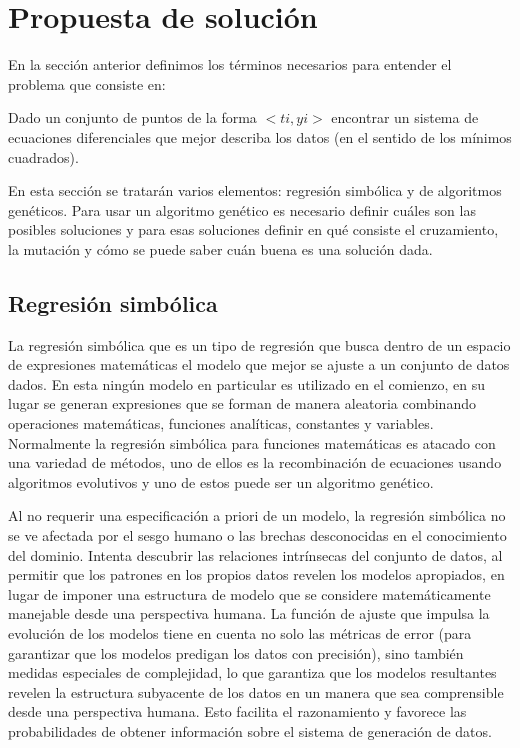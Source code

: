 \chapter{Propuesta de solución}\label{chapter:SolutionProposal}

En la sección anterior definimos los términos necesarios para entender el problema que consiste en:

Dado un conjunto de puntos de la forma $<ti,yi>$ encontrar un sistema de ecuaciones diferenciales que mejor describa los datos (en el sentido de los mínimos cuadrados).

En esta sección se tratarán varios elementos: regresión simbólica y de algoritmos genéticos.  Para usar un algoritmo genético es necesario definir cuáles son las posibles soluciones y para esas soluciones definir en qué consiste el cruzamiento, la mutación y cómo se puede saber cuán buena es una solución dada.

\section{Regresión simbólica}

La regresión simbólica que es un tipo de regresión que busca dentro de un espacio de expresiones matemáticas el modelo que mejor se ajuste a un conjunto de datos dados. En esta ningún modelo en particular es utilizado en el comienzo, en su lugar se generan expresiones que se forman de manera aleatoria combinando operaciones matemáticas, funciones analíticas, constantes y variables. Normalmente la regresión simbólica para funciones matemáticas es atacado con una variedad de métodos, uno de ellos es la recombinación de ecuaciones usando algoritmos evolutivos y uno de estos puede ser un algoritmo genético.

Al no requerir una especificación a priori de un modelo, la regresión simbólica no se ve afectada por el sesgo humano o las brechas desconocidas en el conocimiento del dominio. Intenta descubrir las relaciones intrínsecas del conjunto de datos, al permitir que los patrones en los propios datos revelen los modelos apropiados, en lugar de imponer una estructura de modelo que se considere matemáticamente manejable desde una perspectiva humana. La función de ajuste que impulsa la evolución de los modelos tiene en cuenta no solo las métricas de error (para garantizar que los modelos predigan los datos con precisión), sino también medidas especiales de complejidad, lo que garantiza que los modelos resultantes revelen la estructura subyacente de los datos en un manera que sea comprensible desde una perspectiva humana. Esto facilita el razonamiento y favorece las probabilidades de obtener información sobre el sistema de generación de datos.

